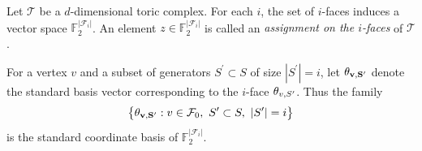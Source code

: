 \begin{definition}
  Let $\mathcal{T}$ be a $d$-dimensional toric complex. For each $i$, the set of $i$-faces induces a vector space $\mathbb{F}_{2}^{|\mathcal{F}_{i}|}$. An element $z\in \mathbb{F}_{2}^{|\mathcal{F}_{i}|}$ is called an \textit{assignment on the $i$-faces} of $\mathcal{T}$.

  For a vertex $v$ and a subset of generators $S^{\prime}\subset S$ of size $|S^{\prime}|=i$, let $\mathbf{\theta_{v ,S^{\prime}}{} }{}$ denote the standard basis vector corresponding to the $i$-face $\theta_{v ,S^{\prime}}{}$. Thus the family
  \begin{equation*}
    \begin{split}
      \bigl\{ \rotfv{v}{S^{\prime}} : v\in\mathcal{F}_{0},\ S^{\prime}\subset S,\ |S^{\prime}|=i \bigr\}
    \end{split}
  \end{equation*}
  is the standard coordinate basis of $\mathbb{F}_{2}^{|\mathcal{F}_{i}|}$.


\end{definition}
